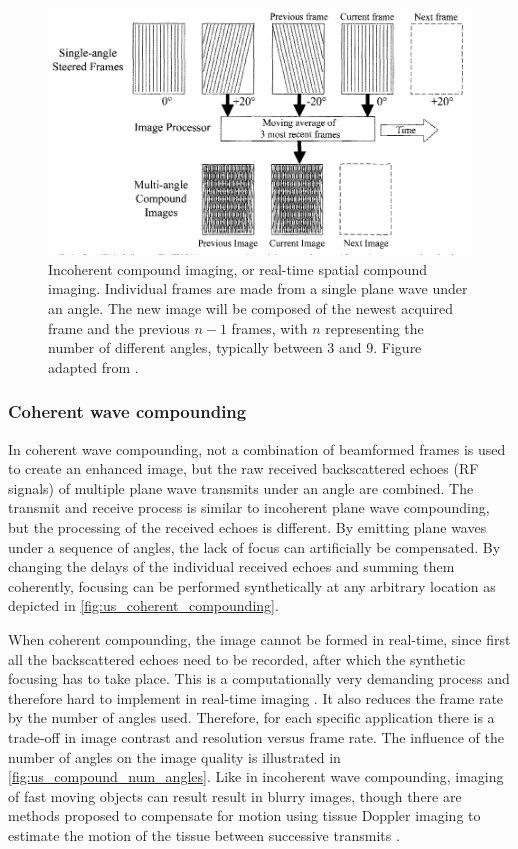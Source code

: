\begin{figure}
    \centering
    \includegraphics[width=.8\linewidth]{Figures/Ultrasound/spatial_compounding.pdf}
    \caption{Incoherent compound imaging, or real-time spatial compound imaging. Individual frames are made from a single plane wave under an angle. The new image will be composed of the newest acquired frame and the previous $n-1$ frames, with $n$ representing the number of different angles, typically between 3 and 9. Figure adapted from \citet{entrekin_real-time_2001}.}
    \label{fig:us_spatial_compounding}
\end{figure}



\subsubsection{Coherent wave compounding}
In coherent wave compounding, not a combination of beamformed frames is used to create an enhanced image, but the raw received backscattered echoes (RF signals) of multiple plane wave transmits under an angle are combined. The transmit and receive process is similar to incoherent plane wave compounding, but the processing of the received echoes is different. By emitting plane waves under a sequence of angles, the lack of focus can artificially be compensated. By changing the delays of the individual received echoes and summing them coherently, focusing can be performed synthetically at any arbitrary location as depicted in \autoref{fig:us_coherent_compounding}. 

When coherent compounding, the image cannot be formed in real-time, since first all the backscattered echoes need to be recorded, after which the synthetic focusing has to take place. This is a computationally very demanding process and therefore hard to implement in real-time imaging \cite{yiu_gpu-based_2011}. It also reduces the frame rate by the number of angles used. Therefore, for each specific application there is a trade-off in image contrast and resolution versus frame rate. The influence of the number of angles on the image quality is illustrated in \autoref{fig:us_compound_num_angles}. Like in incoherent wave compounding, imaging of fast moving objects can result result in blurry images, though there are methods proposed to compensate for motion using tissue Doppler imaging to estimate the motion of the tissue between successive transmits \cite{poree_high-frame-rate_2016}. 

